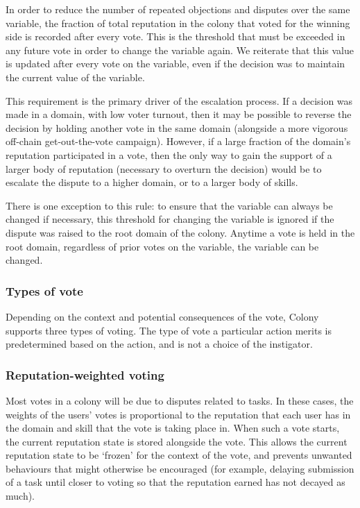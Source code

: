 In order to reduce the number of repeated objections and disputes over the same variable, the fraction of total reputation in the colony that voted for the winning side is recorded after every vote. This is the threshold that must be exceeded in any future vote in order to change the variable again. We reiterate that this value is updated after every vote on the variable, even if the decision was to maintain the current value of the variable.

This requirement is the primary driver of the escalation process. If a decision was made in a domain, with low voter turnout, then it may be possible to reverse the decision by holding another vote in the same domain (alongside a more vigorous off-chain get-out-the-vote campaign). However, if a large fraction of the domain's reputation participated in a vote, then the only way to gain the support of a larger body of reputation (necessary to overturn the decision) would be to escalate the dispute to a higher domain, or to a larger body of skills.

There is one exception to this rule: to ensure that the variable can always be changed if necessary, this threshold for changing the variable is ignored if the dispute was raised to the root domain of the colony. Anytime a vote is held in the root domain, regardless of prior votes on the variable, the variable can be changed.

\subsubsection{Types of vote}

Depending on the context and potential consequences of the vote, Colony supports three types of voting. The type of vote a particular action merits is predetermined based on the action, and is not a choice of the instigator.

\subsubsection*{Reputation-weighted voting}

Most votes in a colony will be due to disputes related to tasks. In these cases, the weights of the users' votes is proportional to the reputation that each user has in the domain and skill that the vote is taking place in. When such a vote starts, the current reputation state is stored alongside the vote. This allows the current reputation state to be `frozen' for the context of the vote, and prevents unwanted behaviours that might otherwise be encouraged (for example, delaying submission of a task until closer to voting so that the reputation earned has not decayed as much).

